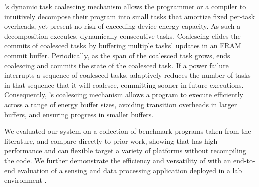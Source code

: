 \sys's dynamic task coalescing mechanism allows the programmer or a compiler to
intuitively decompose their program into small tasks that amortize fixed
per-task overheads, yet present no risk of exceeding device energy capacity. As
such a decomposition executes,  dynamically consecutive
tasks. Coalescing elides the commits of coalesced tasks by buffering multiple
tasks' updates in an FRAM commit buffer.  Periodically, as the span of the
coalesced task grows, \sys ends coalescing and commits the state of the
coalesced task.  If a power failure interrupts a sequence of coalesced tasks,
\sys adaptively reduces the number of tasks in that sequence that it will
coalesce, committing sooner in future executions.  Consequently, \sys's
coalescing mechanism allows a program to execute efficiently across a range of
energy buffer sizes, avoiding transition overheads in larger buffers, and
ensuring progress in smaller buffers. 

We evaluated our system on a collection of benchmark programs taken from the
literature, and compare directly to prior work, showing that \sys has high
performance and can flexible target a variety of platforms without recompiling
the code.  We further demonstrate the efficiency and versatility of \sys with
an end-to-end evaluation of a sensing and data processing application deployed
in a lab environment .


